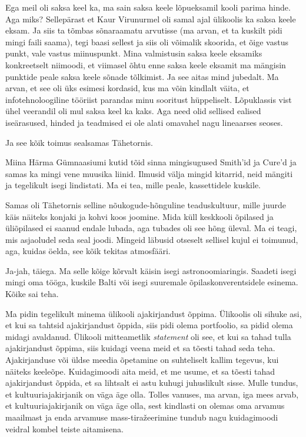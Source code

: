 Ega meil oli saksa keel ka, ma sain saksa keele lõpueksamil kooli parima hinde. 
Aga miks? Sellepärast et Kaur Virunurmel oli samal 
ajal ülikoolis ka saksa keele eksam. Ja siis ta tõmbas sõnaraamatu arvutisse 
(ma arvan, et ta kuskilt pidi mingi faili saama), tegi baasi sellest ja siis oli 
võimalik skoorida, et õige vastus punkt, vale vastus miinuspunkt. Mina  
valmistusin saksa keele eksamiks konkreetselt niimoodi, et viimasel õhtu enne 
saksa keele eksamit ma mängisin punktide peale saksa keele sõnade tõlkimist. Ja 
see aitas mind  jubedalt. Ma arvan, et see oli üks esimesi kordasid, kus ma 
võin kindlalt väita, et infotehnoloogiline tööriist parandas minu sooritust 
hüppeliselt. Lõpuklassis vist ühel veerandil oli mul saksa keel ka kaks. Aga 
need olid sellised ealised iseärasused, hinded ja teadmised ei ole alati 
omavahel nagu lineaarses seoses.

Ja see kõik toimus sealsamas Tähetornis.

Miina Härma Gümnaasiumi kutid tõid sinna 
mingisugused Smith'id ja Cure'd ja 
samas ka mingi vene muusika liinid. Ilmusid välja mingid kitarrid, neid mängiti ja  
tegelikult isegi lindistati. Ma ei tea, mille peale, kassettidele kuskile. 

Samas oli Tähetornis selline  nõukogude-hõnguline teaduskultuur, mille juurde 
käis näiteks konjaki ja kohvi koos joomine. Mida küll  keskkooli õpilased ja 
üliõpilased ei saanud endale lubada, aga tubades  oli see hõng  üleval. Ma ei 
teagi, mis asjaoludel seda seal joodi. Mingeid  läbusid otseselt 
sellisel kujul ei toimunud, aga, kuidas öelda, see kõik tekitas atmosfääri.


Ja-jah, täiega. Ma selle kõige kõrvalt käisin isegi astronoomiaringis. Saadeti 
isegi mingi oma tööga, kuskile Balti või  isegi suuremale  
õpilaskonverentsidele esinema. Kõike sai teha.


Ma pidin tegelikult minema ülikooli ajakirjandust õppima. Ülikoolis oli sihuke 
asi, et kui sa tahtsid ajakirjandust õppida, siis pidi olema portfoolio, sa 
pidid olema midagi avaldanud. Ülikooli mitteametlik \emph{statement} oli see, 
et kui sa tahad tulla ajakirjandust õppima, siis kuidagi veena meid et sa 
tõesti tahad seda teha. Ajakirjanduse või üldse meedia õpetamine on 
 suhteliselt kallim tegevus, kui näiteks keeleõpe. Kuidagimoodi aita 
meid, et me usume, et sa tõesti tahad ajakirjandust õppida, et sa lihtsalt ei  astu 
kuhugi juhuslikult sisse. Mulle tundus, et kultuuriajakirjanik on väga äge olla. Tolles vanuses, 
ma arvan, iga mees arvab, et  kultuuriajakirjanik on väga äge olla, sest 
kindlasti on olemas oma arvamus maailmast ja enda arvamuse mass-tiražeerimine  tundub 
nagu kuidagimoodi veidral kombel teiste aitamisena.

